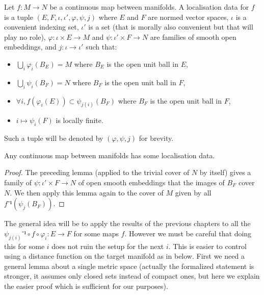 \begin{definition}
  \label{def:localisation_data}
  \leanok
  Let $f : M → N$ be a continuous map between manifolds. A localisation data
  for $f$ is a tuple $(E, F, ι, ι', φ, ψ, j)$ where $E$ and $F$ are normed
  vector spaces, $ι$ is a convenient indexing set, $ι'$ is a set (that is
  morally also convenient but that will play no role), $φ : ι × E → M$
  and $ψ : ι' × F → N$  are families of smooth open embeddings, and
  $j : ι → ι'$ such that:
  \begin{itemize}
    \item
      $⋃_i φ_i(B_E) = M$ where $B_E$ is the open unit ball in $E$,
      \item
      $⋃_i ψ_i(B_F) = N$ where $B_F$ is the open unit ball in $F$,
    \item
      $∀ i, f(φ_i(E)) ⊂ ψ_{j(i)}(B_F)$ where $B_F$ is the open unit ball in $F$,
    \item
      $i \mapsto ψ_i(F)$ is locally finite.
  \end{itemize}
  Such a tuple will be denoted by $(φ, ψ, j)$ for brevity.
\end{definition}

\begin{lemma}
  \label{lem:ex_localisation}
  \leanok
  Any continuous map between manifolds has some localisation data.
\end{lemma}

\begin{proof}
  \leanok
  The preceding lemma (applied to the trivial cover of $N$ by itself) gives a
  family of $ψ : ι' × F → N$ of open smooth embeddings that the images of
  $B_F$ cover $N$. We then apply this lemma again to the cover of $M$ given by all
  $f⁻¹(ψ_j(B_F))$.
\end{proof}

The general idea will be to apply the results of the previous chapters to
all the $ψ_{j(i)}⁻¹ ∘ f ∘ φ_i : E → F$ for some maps $f$. However we must be
careful that doing this for some $i$ does not ruin the setup for the next $i$.
This is easier to control using a distance function on the target manifold as
in  below. First we need a general lemma about
a single metric space (actually the formalized statement is stronger, it assumes
only closed sets instead of compact ones, but here we explain the easier proof
which is sufficient for our purposes).

